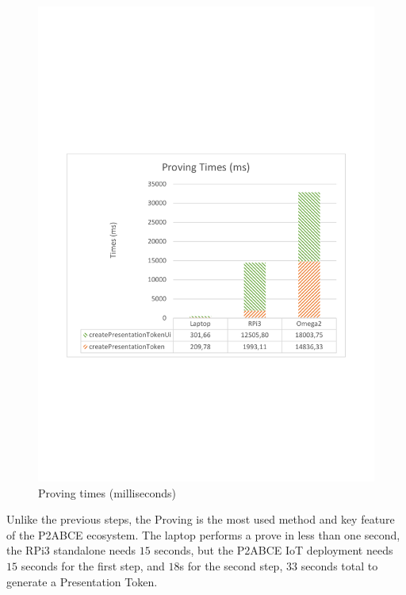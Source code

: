 \begin{figure}[bth]
	\centering
	\includegraphics[width=0.8\linewidth]{gfx/graphics/ProvingGraphTable}
	\caption{Proving times (milliseconds)}%
	\label{fig:proving:graph}
\end{figure}


Unlike the previous steps, the Proving is the most used method and key feature of the P2ABCE ecosystem. The laptop performs a prove in less than one second, the RPi3 standalone needs $15$ seconds, but the P2ABCE IoT deployment needs $15$ seconds for the first step, and $18$s for the second step, $33$ seconds total to generate a Presentation Token.




\hfil



